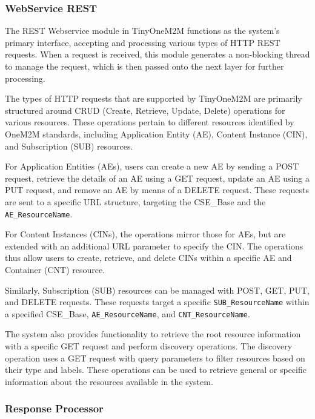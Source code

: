 \documentclass[a4paper,fleqn]{cas-dc}
\begin{document}
\subsubsection{WebService REST}\label{sec:archwebservice}

The REST Webservice module in TinyOneM2M functions as the system's primary interface, accepting and processing various types of HTTP REST requests. When a request is received, this module generates a non-blocking thread to manage the request, which is then passed onto the next layer for further processing.

The types of HTTP requests that are supported by TinyOneM2M are primarily structured around CRUD (Create, Retrieve, Update, Delete) operations for various resources. These operations pertain to different resources identified by OneM2M standards, including Application Entity (AE), Content Instance (CIN), and Subscription (SUB) resources.

For Application Entities (AEs), users can create a new AE by sending a POST request, retrieve the details of an AE using a GET request, update an AE using a PUT request, and remove an AE by means of a DELETE request. These requests are sent to a specific URL structure, targeting the CSE\_Base and the \texttt{AE\_ResourceName}.

For Content Instances (CINs), the operations mirror those for AEs, but are extended with an additional URL parameter to specify the CIN. The operations thus allow users to create, retrieve, and delete CINs within a specific AE and Container (CNT) resource.

Similarly, Subscription (SUB) resources can be managed with POST, GET, PUT, and DELETE requests. These requests target a specific \texttt{SUB\_ResourceName} within a specified CSE\_Base, \texttt{AE\_ResourceName}, and \texttt{CNT\_ResourceName}.

The system also provides functionality to retrieve the root resource information with a specific GET request and perform discovery operations. The discovery operation uses a GET request with query parameters to filter resources based on their type and labels. These operations can be used to retrieve general or specific information about the resources available in the system.

\subsubsection{Response Processor} \label{sec:archresponseprocessor}
\end{document}
